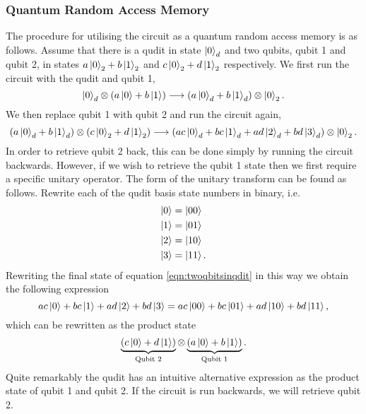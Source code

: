 \subsubsection{Quantum Random Access Memory}
\label{subsubsection:qram}
The procedure for utilising the circuit as a quantum random access memory is as follows.
Assume that there is a qudit in state $\ket{0}_d$ and two qubits, qubit 1 and qubit 2, in states $a\ket{0}_2 + b\ket{1}_2$ and $c\ket{0}_2 + d\ket{1}_2$ respectively.
We first run the circuit with the qudit and qubit 1,
\begin{equation}
    \ket{0}_d \otimes \left(a\ket{0} + b\ket{1}\right) \longrightarrow \left(a\ket{0}_d + b\ket{1}_d\right) \otimes \ket{0}_2.
\end{equation}
We then replace qubit 1 with qubit 2 and run the circuit again,
\begin{equation}
    \left(a\ket{0}_d + b\ket{1}_d\right) \otimes \left(c\ket{0}_2 + d\ket{1}_2 \right) \longrightarrow \left(ac\ket{0}_d + bc\ket{1}_d + ad\ket{2}_d + bd\ket{3}_d \right)\otimes\ket{0}_2.
    \label{eqn:twoqbitsinqdit}
\end{equation}
In order to retrieve qubit 2 back, this can be done simply by running the circuit backwards.
However, if we wish to retrieve the qubit 1 state then we first require a specific unitary operator. The form of the unitary transform can be found as follows.
Rewrite each of the qudit basis state numbers in binary, i.e.
\begin{align}
    \ket{0} &= \ket{00}\\
    \ket{1} &= \ket{01}\\
    \ket{2} &= \ket{10}\\
    \ket{3} &= \ket{11}.
\end{align}
Rewriting the final state of equation \ref{eqn:twoqbitsinqdit} in this way we obtain the following expression
\begin{equation}
    ac\ket{0} + bc\ket{1} + ad\ket{2} + bd\ket{3} = ac\ket{00} + bc\ket{01} + ad\ket{10} + bd\ket{11},
    \label{eqn:binaryexpression}
\end{equation}
which can be rewritten as the product state
\begin{equation}
    \underbrace{\left(c\ket{0} + d\ket{1}\right)}_{\text{Qubit 2}} \otimes \underbrace{\left(a\ket{0} + b\ket{1}\right)}_{\text{Qubit 1}}.
\end{equation}
Quite remarkably the qudit has an intuitive alternative expression as the product state of qubit 1 and qubit 2.
If the circuit is run backwards, we will retrieve qubit 2.
